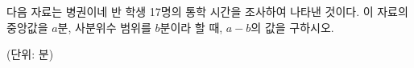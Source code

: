 다음 자료는 병권이네 반 학생 17명의 통학 시간을 조사하여 나타낸 것이다. 이 자료의 중앙값을 $a$분, 사분위수 범위를 $b$분이라 할 때, $a-b$의 값을 구하시오.\par{\raggedleft\small (단위: 분)\par}
